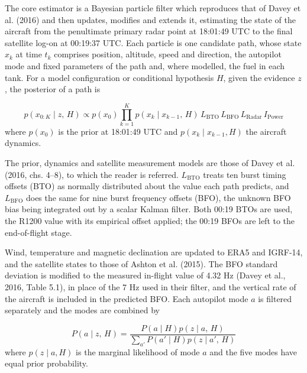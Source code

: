 \setcounter{equation}{2}
The core estimator is a Bayesian particle filter which reproduces that of Davey et al. (2016) and then updates, modifies and extends it, estimating the state of the aircraft from the penultimate primary radar point at 18:01:49 UTC to the final satellite log-on at 00:19:37 UTC. Each particle is one candidate path, whose state $x_k$ at time $t_k$ comprises position, altitude, speed and direction, the autopilot mode and fixed parameters of the path and, where modelled, the fuel in each tank. For a model configuration or conditional hypothesis $H$, given the evidence $z$, the posterior of a path is

\begin{equation}
p\left(x_{0:K} \mid z,\, H\right) \propto p\left(x_{0}\right) \prod_{k=1}^{K} p\left(x_{k} \mid x_{k-1},\, H\right)\, L_{\mathrm{BTO}}\, L_{\mathrm{BFO}}\, L_{\mathrm{Radar}}\, I_{\mathrm{Power}}
\label{eq:31A-3}
\end{equation}
where $p(x_0)$ is the prior at 18:01:49 UTC and $p(x_k \mid x_{k-1}, H)$ the aircraft dynamics.

The prior, dynamics and satellite measurement models are those of Davey et al. (2016, chs. 4--8), to which the reader is referred. $L_{\mathrm{BTO}}$ treats ten burst timing offsets (BTO) as normally distributed about the value each path predicts, and $L_{\mathrm{BFO}}$ does the same for nine burst frequency offsets (BFO), the unknown BFO bias being integrated out by a scalar Kalman filter. Both 00:19 BTOs are used, the R1200 value with its empirical offset applied; the 00:19 BFOs are left to the end-of-flight stage.

Wind, temperature and magnetic declination are updated to ERA5 and IGRF-14, and the satellite states to those of Ashton et al. (2015). The BFO standard deviation is modified to the measured in-flight value of 4.32 Hz (Davey et al., 2016, Table 5.1), in place of the 7 Hz used in their filter, and the vertical rate of the aircraft is included in the predicted BFO. Each autopilot mode $a$ is filtered separately and the modes are combined by

\begin{equation}
P\left(a \mid z,\, H\right) = \frac{P\left(a \mid H\right) p\left(z \mid a,\, H\right)}{\sum_{a'} P\left(a' \mid H\right) p\left(z \mid a',\, H\right)}
\label{eq:31A-4}
\end{equation}
where $p(z \mid a, H)$ is the marginal likelihood of mode $a$ and the five modes have equal prior probability.

